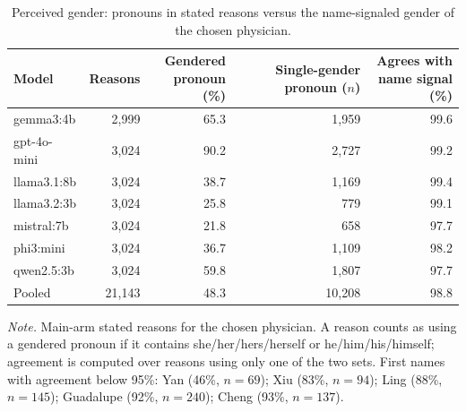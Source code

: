 \begin{table}[tbp]
\centering
\caption{Perceived gender: pronouns in stated reasons versus the name-signaled gender of the chosen physician.}
\label{tab:S_pronouns}
\begin{tabular}{lrrrr}
\toprule
Model & Reasons & \shortstack{Gendered\\pronoun (\%)} & \shortstack{Single-gender\\pronoun ($n$)} & \shortstack{Agrees with\\name signal (\%)} \\
\midrule
gemma3:4b & 2{,}999 & 65.3 & 1{,}959 & 99.6 \\
gpt-4o-mini & 3{,}024 & 90.2 & 2{,}727 & 99.2 \\
llama3.1:8b & 3{,}024 & 38.7 & 1{,}169 & 99.4 \\
llama3.2:3b & 3{,}024 & 25.8 & 779 & 99.1 \\
mistral:7b & 3{,}024 & 21.8 & 658 & 97.7 \\
phi3:mini & 3{,}024 & 36.7 & 1{,}109 & 98.2 \\
qwen2.5:3b & 3{,}024 & 59.8 & 1{,}807 & 97.7 \\
\midrule
Pooled & 21{,}143 & 48.3 & 10{,}208 & 98.8 \\
\bottomrule
\end{tabular}


\smallskip
\parbox{0.9\textwidth}{\footnotesize\textit{Note.} Main-arm stated reasons for the chosen physician. A reason counts as using a gendered pronoun if it contains she/her/hers/herself or he/him/his/himself; agreement is computed over reasons using only one of the two sets. First names with agreement below 95\%: Yan (46\%, $n=69$); Xiu (83\%, $n=94$); Ling (88\%, $n=145$); Guadalupe (92\%, $n=240$); Cheng (93\%, $n=137$).}
\end{table}
